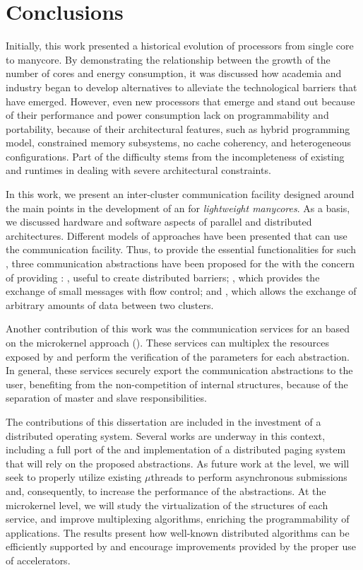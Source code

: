 \chapter{Conclusions}
\label{ch.conclusions}

	Initially, this work presented a historical evolution of processors from single core
    to manycore. By demonstrating the relationship between the growth of the
    number of cores and energy consumption, it was discussed how academia and
    industry began to develop alternatives to alleviate the technological barriers
    that have emerged. However, even new processors that emerge and stand out
    because of their performance and power consumption lack on programmability
    and portability, because of their architectural features, such as hybrid
    programming model, constrained memory subsystems, no cache coherency, and
    heterogeneous configurations. Part of the difficulty stems from the
    incompleteness of existing \oss and runtimes in dealing with severe
    architectural constraints.

	In this work, we present an inter-cluster communication facility designed
    around the main points in the development of an \os for
    \textit{lightweight manycores}. As a basis, we discussed hardware and software
    aspects of parallel and distributed architectures. Different models of \os
    approaches have been presented that can use the communication facility.
    Thus, to provide the essential functionalities for such \oss, three
    communication abstractions have been proposed for the \nanvix \hal with the concern of
    providing \qos: \sync, useful to create distributed
    barriers; \mailbox, which provides the exchange of small messages
    with flow control; and \portal, which allows the exchange
    of arbitrary amounts of data between two clusters.

	Another contribution of this work was the communication services for an \os
    based on the microkernel approach (\nanvix). These services can multiplex
    the resources exposed by \hal and perform the verification of the parameters for
    each abstraction. In general, these services securely export the communication
    abstractions to the user, benefiting from the non-competition of \os internal
    structures, because of the separation of master and slave responsibilities.

	The contributions of this dissertation are included in the investment of a
    distributed operating system. Several works are underway in this context,
    including a full port of the \mpi and implementation of a distributed paging
    system that will rely on the proposed abstractions. As future work at the \hal level, we will
    seek to properly utilize existing \dma $\mu$threads to perform asynchronous
    submissions and, consequently, to increase the performance of the abstractions. At
    the microkernel level, we will study the virtualization of the structures of
    each service, and improve multiplexing algorithms, enriching the
    programmability of applications. The results present how well-known
    distributed algorithms can be efficiently supported by \nanvix \os and
    encourage improvements provided by the proper use of \dma accelerators.